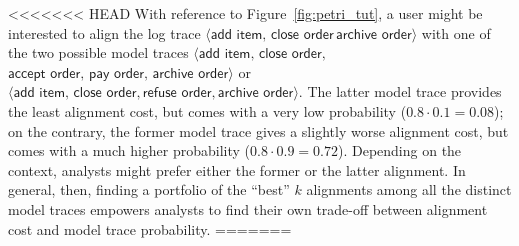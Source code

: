 <<<<<<< HEAD
With reference to Figure~\ref{fig:petri_tut}, a user might be interested to align the log trace $\langle \textsf{add item},\,\textsf{close order}\,\textsf{archive order}\rangle$ with one of the two possible model traces $\langle \textsf{add item},\,\textsf{close order},$ $\textsf{accept order},\,\textsf{pay order},\,\textsf{archive order}\rangle$ or $\langle\textsf{add item},\,\textsf{close order}, \textsf{refuse order}, \textsf{archive order}\rangle$. The latter model trace provides the least alignment cost, but comes with a very low probability ($0.8 \cdot 0.1 = 0.08$); on the contrary, the former model trace gives a slightly worse alignment cost, but comes with a much higher probability ($0.8 \cdot 0.9 = 0.72$). Depending on the context, analysts might prefer either the former or the latter alignment. In general, then, finding a portfolio of the ``best'' $k$ alignments among all the distinct model traces empowers analysts to find their own trade-off between alignment cost and model trace probability.
=======

